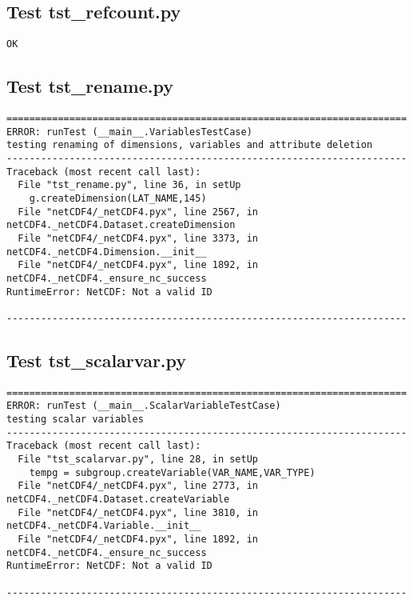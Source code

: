 \subsection{Test tst\_refcount.py}

\begin{verbatim}
OK
\end{verbatim}

\subsection{Test tst\_rename.py}

\begin{verbatim}
======================================================================
ERROR: runTest (__main__.VariablesTestCase)
testing renaming of dimensions, variables and attribute deletion
----------------------------------------------------------------------
Traceback (most recent call last):
  File "tst_rename.py", line 36, in setUp
    g.createDimension(LAT_NAME,145)
  File "netCDF4/_netCDF4.pyx", line 2567, in netCDF4._netCDF4.Dataset.createDimension
  File "netCDF4/_netCDF4.pyx", line 3373, in netCDF4._netCDF4.Dimension.__init__
  File "netCDF4/_netCDF4.pyx", line 1892, in netCDF4._netCDF4._ensure_nc_success
RuntimeError: NetCDF: Not a valid ID

----------------------------------------------------------------------
\end{verbatim}

\subsection{Test tst\_scalarvar.py}

\begin{verbatim}
======================================================================
ERROR: runTest (__main__.ScalarVariableTestCase)
testing scalar variables
----------------------------------------------------------------------
Traceback (most recent call last):
  File "tst_scalarvar.py", line 28, in setUp
    tempg = subgroup.createVariable(VAR_NAME,VAR_TYPE)
  File "netCDF4/_netCDF4.pyx", line 2773, in netCDF4._netCDF4.Dataset.createVariable
  File "netCDF4/_netCDF4.pyx", line 3810, in netCDF4._netCDF4.Variable.__init__
  File "netCDF4/_netCDF4.pyx", line 1892, in netCDF4._netCDF4._ensure_nc_success
RuntimeError: NetCDF: Not a valid ID

----------------------------------------------------------------------
\end{verbatim}

